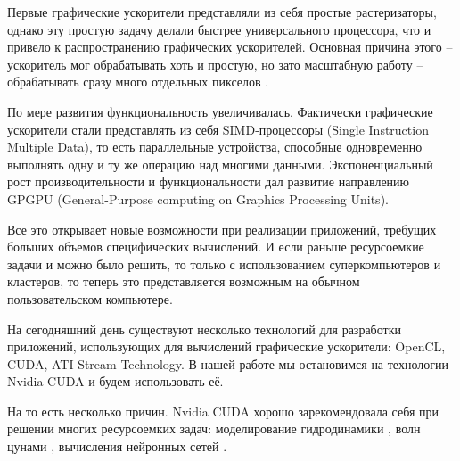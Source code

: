 Первые графические ускорители представляли из себя простые растеризаторы, однако эту простую задачу делали быстрее универсального процессора, что и привело к распространению графических ускорителей. Основная причина этого -- ускоритель мог обрабатывать хоть и простую, но зато масштабную работу -- обрабатывать сразу много отдельных пикселов \cite{boreskov1}.

По мере развития функциональность увеличивалась. Фактически графические ускорители стали представлять из себя SIMD-процессоры (Single Instruction Multiple Data), то есть параллельные устройства, способные одновременно выполнять одну и ту же операцию над многими данными. Экспоненциальный рост производительности и функциональности дал развитие направлению GPGPU (General-Purpose computing on Graphics Processing Units). 

Все это открывает новые возможности при реализации приложений, требущих больших объемов специфических вычислений. И если раньше ресурсоемкие задачи и можно было решить, то только с использованием суперкомпьютеров и кластеров, то теперь это представляется возможным на обычном пользовательском  компьютере. 

На сегодняшний день существуют несколько технологий для разработки приложений, использующих для вычислений графические ускорители: OpenCL, CUDA, ATI Stream Technology. В нашей работе мы остановимся на технологии Nvidia CUDA и будем использовать её. 

На то есть несколько причин. Nvidia CUDA хорошо зарекомендовала себя при решении многих ресурсоемких задач: моделирование гидродинамики \cite{berezin}, волн цунами \cite{cynami}, вычисления нейронных сетей \cite{neuron}.


